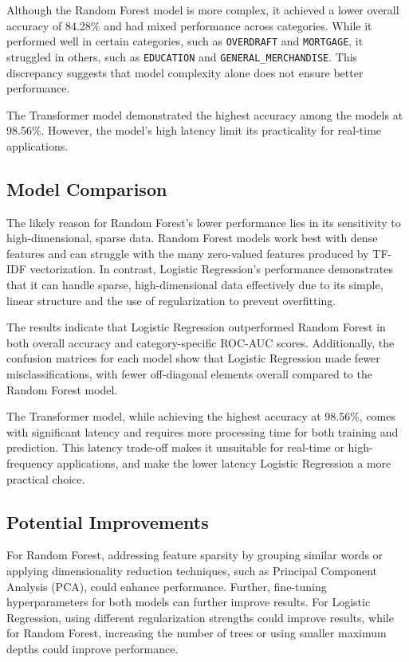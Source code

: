 \documentclass[12pt,letterpaper]{article}
\begin{document}
Although the Random Forest model is more complex, it achieved a lower overall accuracy of 84.28\% and had mixed performance across categories. While it performed well in certain categories, such as \texttt{OVERDRAFT} and \texttt{MORTGAGE}, it struggled in others, such as \texttt{EDUCATION} and \texttt{GENERAL\_MERCHANDISE}. This discrepancy suggests that model complexity alone does not ensure better performance.

The Transformer model demonstrated the highest accuracy among the models at 98.56\%. However, the model’s high latency limit its practicality for real-time applications. 

\subsection{Model Comparison}
The likely reason for Random Forest’s lower performance lies in its sensitivity to high-dimensional, sparse data. Random Forest models work best with dense features and can struggle with the many zero-valued features produced by TF-IDF vectorization. In contrast, Logistic Regression’s performance demonstrates that it can handle sparse, high-dimensional data effectively due to its simple, linear structure and the use of regularization to prevent overfitting.

The results indicate that Logistic Regression outperformed Random Forest in both overall accuracy and category-specific ROC-AUC scores. Additionally, the confusion matrices for each model show that Logistic Regression made fewer misclassifications, with fewer off-diagonal elements overall compared to the Random Forest model.

The Transformer model, while achieving the highest accuracy at 98.56\%, comes with significant latency and requires more processing time for both training and prediction. This latency trade-off makes it unsuitable for real-time or high-frequency applications, and make the lower latency Logistic Regression a more practical choice.


\subsection{Potential Improvements}
For Random Forest, addressing feature sparsity by grouping similar words or applying dimensionality reduction techniques, such as Principal Component Analysis (PCA), could enhance performance. Further, fine-tuning hyperparameters for both models can further improve results. For Logistic Regression, using different regularization strengths could improve results, while for Random Forest, increasing the number of trees or using smaller maximum depths could improve performance.
\end{document}
